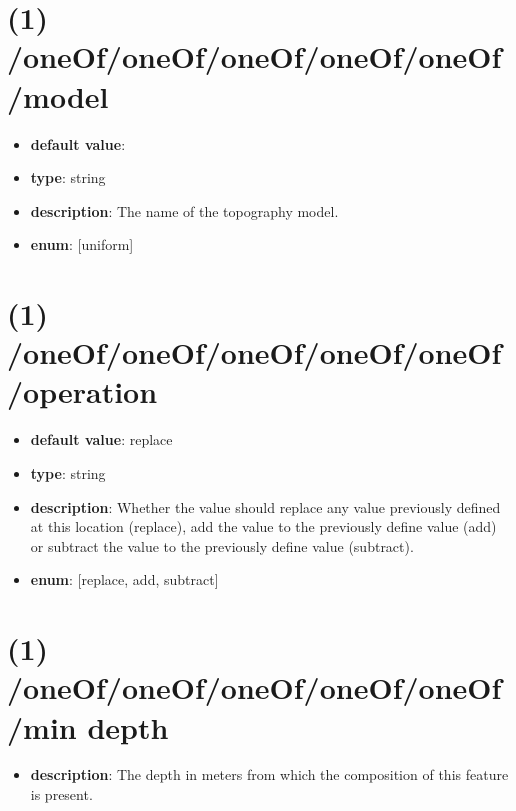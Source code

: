 \section{(1) /oneOf/oneOf/oneOf/oneOf/oneOf/model}
\begin{itemize}[leftmargin=1em]\item {\bf default value}: 
\item {\bf type}: string
\item {\bf description}: The name of the topography model.
\item {\bf enum}: [uniform]\end{itemize}\section{(1) /oneOf/oneOf/oneOf/oneOf/oneOf/operation}
\begin{itemize}[leftmargin=1em]\item {\bf default value}: replace
\item {\bf type}: string
\item {\bf description}: Whether the value should replace any value previously defined at this location (replace), add the value to the previously define value (add) or subtract the value to the previously define value (subtract).
\item {\bf enum}: [replace, add, subtract]\end{itemize}\section{(1) /oneOf/oneOf/oneOf/oneOf/oneOf/min depth}
\begin{itemize}[leftmargin=1em]\item {\bf description}: The depth in meters from which the composition of this feature is present.
\end{itemize}
